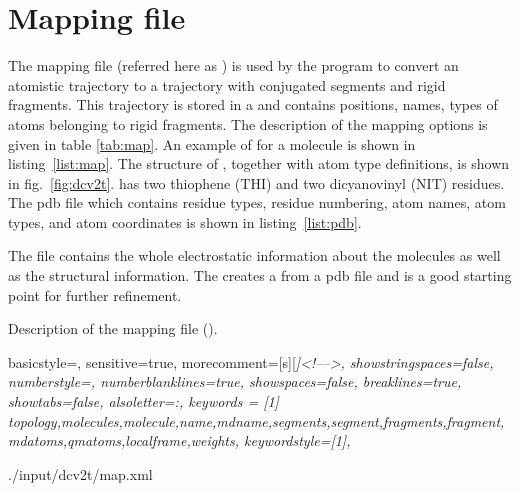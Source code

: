 \section{Mapping file}
\label{sec:xmlmap}
The mapping file (referred here as \xmlcsg) is used by the program \ctpmap to convert an atomistic trajectory to a trajectory with conjugated segments and rigid fragments. 
This trajectory is stored in a  and contains positions, names, types of atoms belonging to rigid fragments. 
The description of the mapping options is given in table \ref{tab:map}. An example of \xmlcsg for a \dcvt molecule is shown in listing~\ref{list:map}.  The structure of \dcvt, together with atom type definitions, is shown in fig.~\ref{fig:dcv2t}. \dcvt has two thiophene (THI) and two dicyanovinyl (NIT) residues. The pdb file which contains residue types, residue numbering, atom names, atom types, and atom coordinates is shown in listing~\ref{list:pdb}.

The file \xmlcsg contains the whole electrostatic information about the molecules as well as the structural information. The  creates a \xmlcsg from a pdb file and is a good starting point for further refinement. 
%
\begin{table}[h]
\label{tab:map}
\caption{Description of the \xml mapping file (\xmlcsg).}
\end{table}
%
 {
   basicstyle=\ttfamily\scriptsize,
   sensitive=true,
   morecomment=[s][\color{gray}\rmfamily\itshape]{<!--}{-->}, 
   showstringspaces=false,
   numberstyle=\scriptsize,
   numberblanklines=true,
   showspaces=false,
   breaklines=true,
   showtabs=false,
   alsoletter={:},
   keywords = [1]
   { topology,molecules,molecule,name,mdname,segments,segment,fragments,fragment,mdatoms,qmatoms,localframe,weights},
   keywordstyle={[1]\color{blue}},
}

%
{./input/dcv2t/map.xml}
